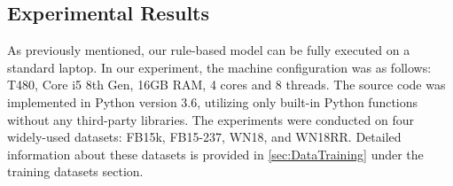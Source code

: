 \subsection{Experimental Results}
\label{sec:Experiment}

As previously mentioned, our rule-based model can be fully executed on a standard laptop. In our experiment, the machine configuration was as follows: T480, Core i5 8th Gen, 16GB RAM, 4 cores and 8 threads. The source code was implemented in Python version 3.6, utilizing only built-in Python functions without any third-party libraries. The experiments were conducted on four widely-used datasets: FB15k, FB15-237, WN18, and WN18RR. Detailed information about these datasets is provided in \autoref{sec:DataTraining} under the training datasets section.



\begin{table}[h]
	\begin{center}
		\caption{Experimental results on the FB15k and FB15k-237 datasets}
		\label{tab:resultOnFreeBase}%
	\end{center}
\end{table}


